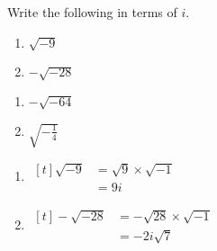 \documentclass[11pt,a4paper]{book}
\begin{document}
\begin{example}

Write the following in terms of $i$.

\begin{minipage}[t]{0.5\textwidth}

\begin{enumerate}[label=(\alph*)]

\item  $\sqrt{-9}$

\addtocounter{enumi}{1}

\item  $-\sqrt{-28}$

\end{enumerate}

\end{minipage}
\begin{minipage}[t]{0.5\textwidth}

\begin{enumerate}[label=(\alph*),start=2]

\item  $-\sqrt{-64}$

\addtocounter{enumi}{1}

\item ${\displaystyle \sqrt{-\frac{1}{4}}}$

\end{enumerate}

\end{minipage}

\Solution

\begin{minipage}[t]{0.5\textwidth}

\begin{enumerate}[label=(\alph*)]

\item
$
\begin{aligned}[t]
\sqrt{-9} & =\sqrt{9}\times\sqrt{-1}\\
 & =9i
\end{aligned}
$



\addtocounter{enumi}{1}

\item

$
\begin{aligned}[t]
-\sqrt{-28} & =-\sqrt{28}\times\sqrt{-1}\\
 & =-2i\sqrt{7}
\end{aligned}
$

\end{enumerate}


\end{minipage}
\end{example}
\end{document}
